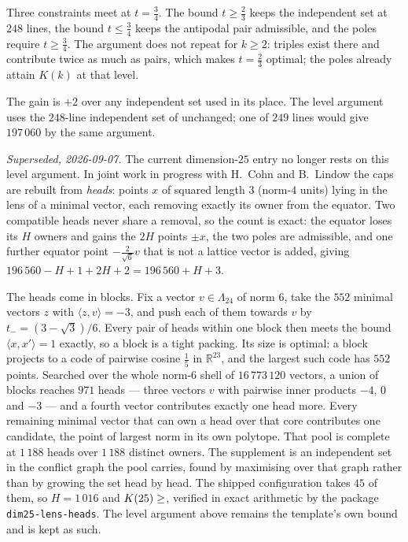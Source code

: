 \documentclass[11pt]{amsart}
\theoremstyle{remark}
\newcommand{\Leech}{\Lambda_{24}}
\newcommand{\ip}[2]{\langle #1,#2\rangle}
\newcommand{\R}{\mathbb{R}}
\begin{document}
Three constraints meet at $t=\tfrac34$. The bound $t\ge\tfrac23$ keeps the
independent set at $248$ lines, the bound $t\le\tfrac34$ keeps the antipodal pair
admissible, and the poles require $t\ge\tfrac34$. The argument does not repeat for
$k\ge2$: triples exist there and contribute twice as much as pairs, which makes
$t=\tfrac23$ optimal; the poles already attain $K(k)$ at that level.

The gain is $+2$ over any independent set used in its place. The level argument
uses the $248$-line independent set of \cite{ma-etal2025} unchanged; one of
$249$ lines would give $197\,060$ by the same argument.

\emph{Superseded, 2026-09-07.} The current dimension-$25$ entry
no longer rests on this level argument. In joint work in progress with H.~Cohn
and B.~Lindow the caps are rebuilt from \emph{heads}: points $x$ of squared
length $3$ (norm-$4$ units) lying in the lens of a minimal vector, each removing
exactly its owner from the equator. Two compatible heads never share a removal,
so the count is exact: the equator loses its $H$ owners and gains the $2H$ points
$\pm x$, the two poles are admissible, and one further equator point
$-\tfrac{2}{\sqrt6}v$ that is not a lattice vector is added, giving
$196\,560-H+1+2H+2=196\,560+H+3$.

The heads come in blocks. Fix a vector $v\in\Leech$ of norm $6$, take the $552$
minimal vectors $z$ with $\ip{z}{v}=-3$, and push each of them towards $v$ by
$t_-=(3-\sqrt3)/6$. Every pair of heads within one block then meets the bound
$\ip{x}{x'}=1$ exactly, so a block is a tight packing. Its size is optimal: a
block projects to a code of pairwise cosine $\tfrac15$ in $\R^{23}$, and the
largest such code has $552$ points. Searched over the whole norm-$6$
shell of $16\,773\,120$ vectors, a union of blocks reaches $971$ heads --- three
vectors $v$ with pairwise inner products $-4$, $0$ and $-3$ --- and a fourth
vector contributes exactly one head more. Every remaining minimal vector that
can own a head over that core contributes one candidate, the point of largest
norm in its own polytope. That pool is complete at $1\,188$ heads over
$1\,188$ distinct owners. The supplement is an independent set in the conflict
graph the pool carries, found by maximising over that graph rather than by
growing the set head by head. The shipped configuration takes $45$ of them, so
$H=1\,016$ and
$K(25)\ge\Kh{25}$, verified in exact arithmetic by the package
\texttt{dim25-lens-heads}. The level
argument above remains the template's own bound and is kept as such.
\end{document}
